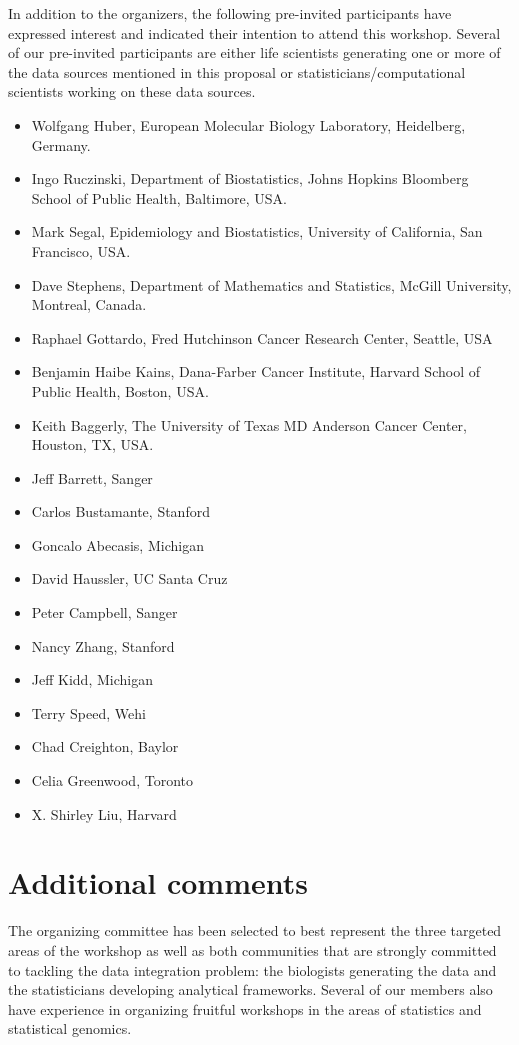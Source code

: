 \documentclass[12pt]{amsart}
\begin{document}
In addition to the organizers, the following pre-invited participants
have expressed interest and indicated their intention to attend this
workshop. Several of our pre-invited participants are either life
scientists generating one or more of the data sources mentioned in
this proposal or statisticians/computational scientists working on
these data sources.

\begin{itemize}
\item Wolfgang Huber, European Molecular Biology Laboratory, Heidelberg, Germany.
\item Ingo Ruczinski, Department of Biostatistics, Johns Hopkins Bloomberg School of Public Health, Baltimore, USA.
\item Mark Segal, Epidemiology  and Biostatistics, University of California, San Francisco, USA.
\item Dave Stephens, Department of Mathematics and Statistics, McGill University, Montreal, Canada.
\item Raphael Gottardo, Fred Hutchinson Cancer Research Center, Seattle, USA
\item Benjamin Haibe Kains, Dana-Farber Cancer Institute, Harvard
  School of Public Health, Boston, USA.
\item Keith Baggerly, The University of Texas MD Anderson Cancer
  Center, Houston, TX, USA.
\item Jeff Barrett, Sanger
\item Carlos Bustamante, Stanford
\item Goncalo Abecasis, Michigan
\item David Haussler, UC Santa Cruz
\item Peter Campbell, Sanger
\item Nancy Zhang, Stanford
\item Jeff Kidd, Michigan
\item Terry Speed, Wehi
\item Chad Creighton, Baylor
\item Celia Greenwood, Toronto
\item X. Shirley Liu, Harvard
\end{itemize}



\section*{Additional comments}

The organizing committee has been selected to best represent the three
targeted areas of the workshop as well as both communities that are
strongly committed to tackling the data integration problem: the
biologists generating the data and the statisticians developing
analytical frameworks. Several of our members also have experience in
organizing fruitful workshops in the areas of statistics and
statistical genomics.
\end{document}
